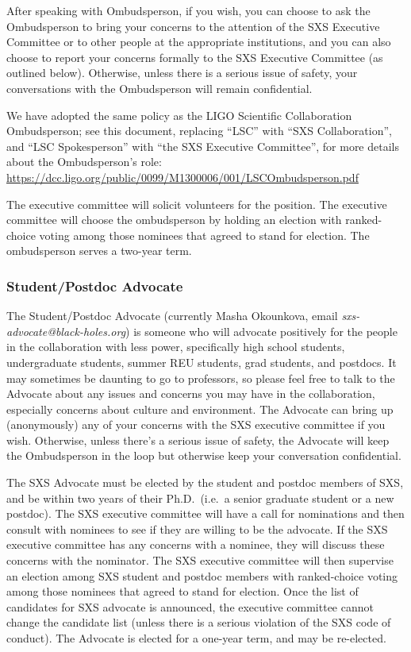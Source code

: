 After speaking with Ombudsperson, if you wish, you can choose to ask
the Ombudsperson to bring your concerns to the attention of the SXS
Executive Committee or to other people at the appropriate
institutions, and you can also choose to report your concerns formally
to the SXS Executive Committee (as outlined below). Otherwise, unless
there is a serious issue of safety, your conversations with the
Ombudsperson will remain confidential.

We have adopted the same policy as the LIGO Scientific Collaboration
Ombudsperson; see this document, replacing “LSC” with “SXS
Collaboration”, and “LSC Spokesperson” with “the SXS Executive
Committee”, for more details about the Ombudsperson’s role:
\url{https://dcc.ligo.org/public/0099/M1300006/001/LSCOmbudsperson.pdf}

The executive committee will solicit volunteers for the
position.  The executive committee will choose the ombudsperson by
holding an election with ranked-choice voting among those nominees
that agreed to stand for election.  The ombudsperson serves a
two-year term.

\subsubsection{Student/Postdoc Advocate}
The Student/Postdoc Advocate (currently Masha Okounkova, email
\emph{sxs-advocate@black-holes.org}) is someone who will advocate
positively for the people in the collaboration with less power,
specifically high school students, undergraduate students, summer REU
students, grad students, and postdocs. It may sometimes be daunting to
go to professors, so please feel free to talk to the Advocate about
any issues and concerns you may have in the collaboration, especially
concerns about culture and environment. The Advocate can bring up
(anonymously) any of your concerns with the SXS executive committee if
you wish. Otherwise, unless there’s a serious issue of safety, the
Advocate will keep the Ombudsperson in the loop but otherwise keep
your conversation confidential.


The SXS Advocate must be elected by the student and postdoc members of
SXS, and be within two years of their Ph.D.~(i.e.~a senior graduate
student or a new postdoc).  The SXS executive committee will have a
call for nominations and then consult with nominees to see if they are
willing to be the advocate.  If the SXS executive committee has any
concerns with a nominee, they will discuss these concerns with the
nominator.  The SXS executive committee will then supervise an
election among SXS student and postdoc members with ranked-choice
voting among those nominees that agreed to stand for election.  Once
the list of candidates for SXS advocate is announced, the executive
committee cannot change the candidate list (unless there is a serious
violation of the SXS code of conduct).  The Advocate is elected for a
one-year term, and may be re-elected.


